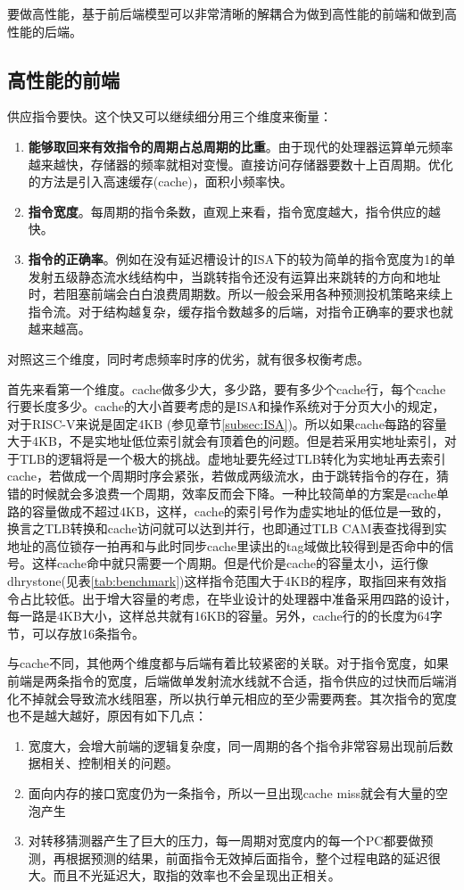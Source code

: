 要做高性能，基于前后端模型可以非常清晰的解耦合为做到高性能的前端和做到高性能的后端。
	\subsection{高性能的前端}
	
	供应指令要快。这个快又可以继续细分用三个维度来衡量：
	\begin{enumerate}[label=(\alph*)]
		\item \textbf{能够取回来有效指令的周期占总周期的比重}。由于现代的处理器运算单元频率越来越快，存储器的频率就相对变慢。直接访问存储器要数十上百周期。优化的方法是引入高速缓存(cache)，面积小频率快。
		\item \textbf{指令宽度}。每周期的指令条数，直观上来看，指令宽度越大，指令供应的越快。
		\item \textbf{指令的正确率}。例如在没有延迟槽设计的ISA下的较为简单的指令宽度为1的单发射五级静态流水线结构中，当跳转指令还没有运算出来跳转的方向和地址时，若阻塞前端会白白浪费周期数。所以一般会采用各种预测投机策略来续上指令流。对于结构越复杂，缓存指令数越多的后端，对指令正确率的要求也就越来越高。
	\end{enumerate}

	对照这三个维度，同时考虑频率时序的优劣，就有很多权衡考虑。
	
	首先来看第一个维度。cache做多少大，多少路，要有多少个cache行，每个cache行要长度多少。cache的大小首要考虑的是ISA和操作系统对于分页大小的规定，对于RISC-V来说是固定4KB (参见章节\ref{subsec:ISA})。所以如果cache每路的容量大于4KB，不是实地址低位索引就会有顶着色的问题。但是若采用实地址索引，对于TLB的逻辑将是一个极大的挑战。虚地址要先经过TLB转化为实地址再去索引cache，若做成一个周期时序会紧张，若做成两级流水，由于跳转指令的存在，猜错的时候就会多浪费一个周期，效率反而会下降。一种比较简单的方案是cache单路的容量做成不超过4KB，这样，cache的索引号作为虚实地址的低位是一致的，换言之TLB转换和cache访问就可以达到并行，也即通过TLB CAM表查找得到实地址的高位锁存一拍再和与此时同步cache里读出的tag域做比较得到是否命中的信号。这样cache命中就只需要一个周期。但是代价是cache的容量太小，运行像dhrystone(见表\ref{tab:benchmark})这样指令范围大于4KB的程序，取指回来有效指令占比较低。出于增大容量的考虑，在毕业设计的处理器中准备采用四路的设计，每一路是4KB大小，这样总共就有16KB的容量。另外，cache行的的长度为64字节，可以存放16条指令。
	
	与cache不同，其他两个维度都与后端有着比较紧密的关联。对于指令宽度，如果前端是两条指令的宽度，后端做单发射流水线就不合适，指令供应的过快而后端消化不掉就会导致流水线阻塞，所以执行单元相应的至少需要两套。其次指令的宽度也不是越大越好，原因有如下几点：
	\begin{enumerate}[label=(\alph*)]
		\item 宽度大，会增大前端的逻辑复杂度，同一周期的各个指令非常容易出现前后数据相关、控制相关的问题。
		\item 面向内存的接口宽度仍为一条指令，所以一旦出现cache miss就会有大量的空泡产生
		\item 对转移猜测器产生了巨大的压力，每一周期对宽度内的每一个PC都要做预测，再根据预测的结果，前面指令无效掉后面指令，整个过程电路的延迟很大。而且不光延迟大，取指的效率也不会呈现出正相关。
	\end{enumerate}
	
